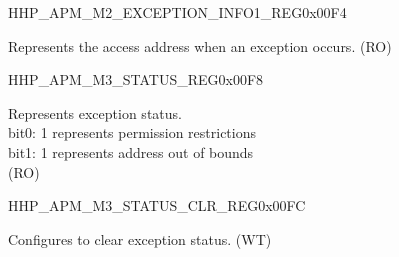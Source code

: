 \begin{register}{H}{HP\_APM\_M2\_EXCEPTION\_INFO1\_REG}{0x00F4}\label{regdesc:HPAPMM2EXCEPTIONINFO1REG}
%
\regnewline%
\begin{regdesc}\begin{reglist}
\label{fielddesc:HPAPMM2EXCEPTIONADDR}\item [HP\_APM\_M2\_EXCEPTION\_ADDR] Represents the access address when an exception occurs. (RO)
\end{reglist}\end{regdesc}
\end{register}


\begin{register}{H}{HP\_APM\_M3\_STATUS\_REG}{0x00F8}\label{regdesc:HPAPMM3STATUSREG}
%
%
\regnewline%
\begin{regdesc}\begin{reglist}
\label{fielddesc:HPAPMM3EXCEPTIONSTATUS}\item [HP\_APM\_M3\_EXCEPTION\_STATUS] Represents exception status.\\ 
bit0: 1 represents permission restrictions \\ 
bit1: 1 represents address out of bounds  \\ (RO)
\end{reglist}\end{regdesc}
\end{register}


\begin{register}{H}{HP\_APM\_M3\_STATUS\_CLR\_REG}{0x00FC}\label{regdesc:HPAPMM3STATUSCLRREG}
%
%
\regnewline%
\begin{regdesc}\begin{reglist}
\label{fielddesc:HPAPMM3REGIONSTATUSCLR}\item [HP\_APM\_M3\_REGION\_STATUS\_CLR] Configures to clear exception status. (WT)
\end{reglist}\end{regdesc}
\end{register}


